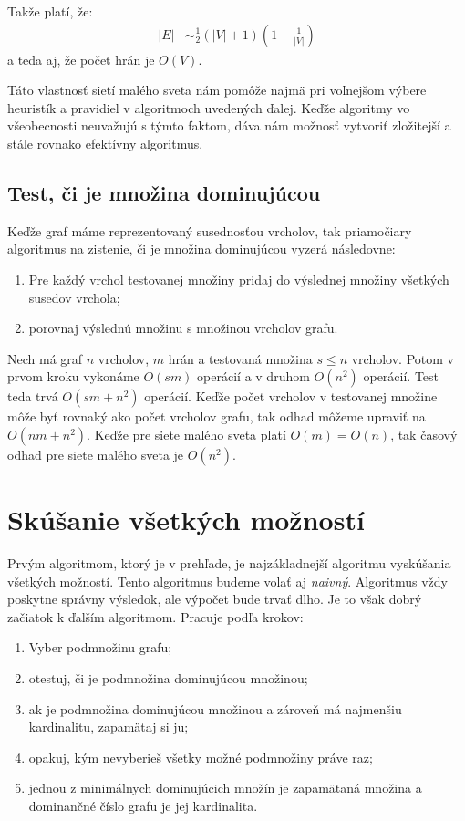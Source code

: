 Takže platí, že:
\begin{align*}
|E|&\sim \frac{1}{2}\left(|V| + 1\right)\left( 1 - \frac{1}{|V|} \right)
\end{align*}
a teda aj, že počet hrán je $O(V)$.

Táto vlastnosť sietí malého sveta nám pomôže najmä pri voľnejšom výbere 
heuristík a pravidiel v algoritmoch uvedených ďalej. Keďže algoritmy vo 
všeobecnosti neuvažujú s týmto faktom, dáva nám možnosť vytvoriť zložitejší a 
stále rovnako efektívny algoritmus.

\subsection{Test, či je množina dominujúcou}

Keďže graf máme reprezentovaný susednosťou vrcholov, tak priamočiary algoritmus 
na zistenie, či je množina dominujúcou vyzerá následovne:

\begin{enumerate}
	\item Pre každý vrchol testovanej množiny pridaj do výslednej množiny 
všetkých susedov vrchola;
	\item porovnaj výslednú množinu s množinou vrcholov grafu.
\end{enumerate}

Nech má graf $n$ vrcholov, $m$ hrán a testovaná množina $s \leq n$ vrcholov. 
Potom v prvom kroku vykonáme $O(sm)$ operácií a v druhom $O(n^2)$ operácií. 
Test teda trvá $O(sm + n^2)$ operácií. Keďže počet vrcholov v testovanej 
množine môže byť rovnaký ako počet vrcholov grafu, tak odhad môžeme upraviť na 
$O(nm + n^2)$. Keďže pre siete malého sveta platí $O(m) = O(n)$, tak časový 
odhad pre siete malého sveta je $O(n^2)$.

\section{Skúšanie všetkých možností}

Prvým algoritmom, ktorý je v prehľade, je najzákladnejší algoritmu vyskúšania 
všetkých možností. Tento algoritmus budeme volať aj \emph{naivný}. Algoritmus 
vždy poskytne správny výsledok, ale výpočet bude trvať dlho. Je 
to však dobrý začiatok k ďalším algoritmom. Pracuje podľa krokov:

\begin{enumerate}
	\item \label{itm:bf:one} Vyber podmnožinu grafu;
	\item \label{itm:bf:two} otestuj, či je podmnožina dominujúcou množinou;
	\item \label{itm:bf:three} ak je podmnožina dominujúcou množinou a zároveň má najmenšiu 
kardinalitu, zapamätaj si ju;
	\item \label{itm:bf:four} opakuj, kým nevyberieš všetky možné podmnožiny práve raz;
	\item \label{itm:bf:five} jednou z minimálnych dominujúcich množín je zapamätaná množina a 
dominančné číslo grafu je jej kardinalita.
\end{enumerate}

